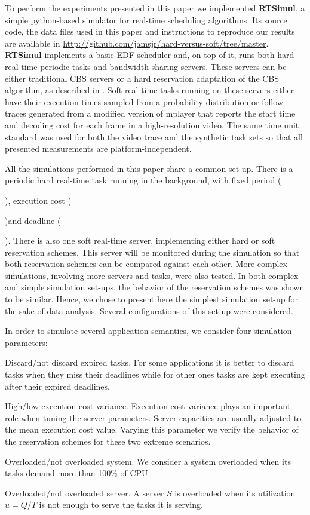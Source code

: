 \documentclass[times, 10pt,twocolumn]{article}
\newcounter{notecounter}
\newcommand{\nota}[1]{\addtocounter{notecounter}{1}{\textcolor{red}{[nota
      \arabic{notecounter}: #1]}}}
\newcommand{\simul}{\textbf{RTSimul}} %
\begin{document}
To perform the experiments presented in this paper we implemented
\simul{}, a simple python-based simulator for real-time scheduling
algorithms. Its source code, the data files used in this paper and
instructions to reproduce our results are available in
\url{http://github.com/jamsjr/hard-versus-soft/tree/master}. \simul{}
implements a basic EDF scheduler and, on top of it, runs both hard
real-time periodic tasks and bandwidth sharing servers. These servers
can be either traditional CBS servers \cite{abeni.ea98:integrating} or
a hard reservation adaptation of the CBS algorithm, as described in
\cite{buttazzo05:soft}. Soft real-time tasks running on these servers
either have their execution times sampled from a probability
distribution or follow traces generated from a modified version of
mplayer that reports the start time and decoding cost for each frame
in a high-resolution video. The same time unit standard was used for
both the video trace and the synthetic task sets so that all presented
measurements are platform-independent.

All the simulations performed in this paper share a common
set-up. There is a periodic hard real-time task running in the
background, with fixed period (\nota{x}), execution cost (\nota{y})and
deadline (\nota{z}).  There is also one soft real-time server,
implementing either hard or soft reservation schemes.  This server
will be monitored during the simulation so that both reservation
schemes can be compared against each other. More complex simulations,
involving more servers and tasks, were also tested. In both complex
and simple simulation set-ups, the behavior of the reservation schemes
was shown to be similar. Hence, we chose to present here the simplest
simulation set-up for the sake of data analysis.  Several
configurations of this set-up were considered.

\label{sec:configurations}

In order to simulate several application semantics, we consider four simulation parameters: 
\begin{description}
\item Discard/not discard expired tasks. For some applications it is
  better to discard tasks when they miss their deadlines while for
  other ones tasks are kept executing after their expired deadlines.
\item High/low execution cost variance. Execution cost variance plays
  an important role when tuning the server parameters. Server
  capacities are usually adjusted to the mean execution cost
  value. Varying this parameter we verify the behavior of the
  reservation schemes for these two extreme scenarios.
\item Overloaded/not overloaded system. We consider a system
  overloaded when its tasks demand more than 100\% of CPU.
\item Overloaded/not overloaded server. A server $S$ is overloaded
  when its utilization $u = Q/T$ is not enough to serve the
  tasks it is serving.
\end{description}
\end{document}

